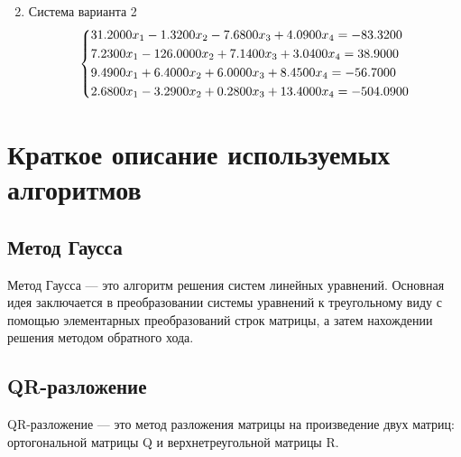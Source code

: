\documentclass{article}
\begin{document}
\begin{enumerate}
\begin{equation}
        \end{equation}
        \item Система варианта 2
        \begin{equation}
            \begin{dcases}
                31.2000x_1 -1.3200x_2 -7.6800 x_3 + 4.0900 x_4 = -83.3200 \\
                7.2300 x_1 -126.0000 x_2 + 7.1400 x_3 + 3.0400 x_4 = 38.9000 \\ 
                9.4900 x_1 + 6.4000 x_2 + 6.0000 x_3 + 8.4500 x_4 = -56.7000 \\ 
                2.6800 x_1 -3.2900 x_2 + 0.2800 x_3 + 13.4000 x_4 = -504.0900
            \end{dcases}
        \end{equation}  
    \end{enumerate}

\section{Краткое описание используемых алгоритмов}
\subsection{Метод Гаусса}
Метод Гаусса --- это алгоритм решения систем линейных уравнений. 
Основная идея заключается в преобразовании системы уравнений к треугольному виду с 
помощью элементарных преобразований строк матрицы, а затем нахождении решения методом обратного 
хода.
\subsection{QR-разложение}
QR-разложение --- это метод разложения матрицы на произведение двух матриц: ортогональной матрицы 
Q и верхнетреугольной матрицы R.
\end{document}
